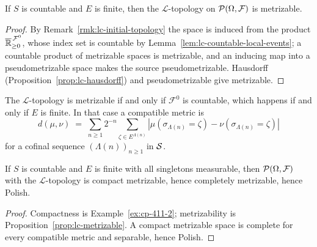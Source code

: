 \begin{proposition}
    \label{prop:lc-metrizable}
    \leanok

    If $S$ is countable and $E$ is finite, then the $\mathcal{L}$-topology on
    $\mathcal{P}(\Omega, \mathcal{F})$ is metrizable.
\end{proposition}
\begin{proof}
    \leanok

    By Remark~\ref{rmk:lc-initial-topology} the space is induced from the product
    $\overline{\mathbb{R}}_{\ge 0}^{\,\mathcal{F}^0}$, whose index set is countable by
    Lemma~\ref{lem:lc-countable-local-events}; a countable product of metrizable spaces is
    metrizable, and an inducing map into a pseudometrizable space makes the source
    pseudometrizable. Hausdorff (Proposition~\ref{prop:lc-hausdorff}) and pseudometrizable give
    metrizable.
\end{proof}

\begin{remark}
    \label{rmk:lc-metrizability-converse}

    The $\mathcal{L}$-topology is metrizable if and only if $\mathcal{F}^0$ is countable, which
    happens if and only if $E$ is finite. In that case a compatible metric is
    \[
        d(\mu, \nu) \;=\; \sum_{n \ge 1} 2^{-n} \sum_{\zeta \in E^{\Lambda(n)}}
        |\mu(\sigma_{\Lambda(n)} = \zeta) - \nu(\sigma_{\Lambda(n)} = \zeta)|
    \]
    for a cofinal sequence $(\Lambda(n))_{n \ge 1}$ in $\mathcal{S}$.
\end{remark}

\begin{corollary}
    \label{cor:lc-polish}
    \leanok

    If $S$ is countable and $E$ is finite with all singletons measurable, then
    $\mathcal{P}(\Omega, \mathcal{F})$ with the $\mathcal{L}$-topology is compact metrizable, hence
    completely metrizable, hence Polish.
\end{corollary}
\begin{proof}
    \leanok

    Compactness is Example~\ref{ex:cp-411-2}; metrizability is
    Proposition~\ref{prop:lc-metrizable}. A compact metrizable space is complete for every
    compatible metric and separable, hence Polish.
\end{proof}


